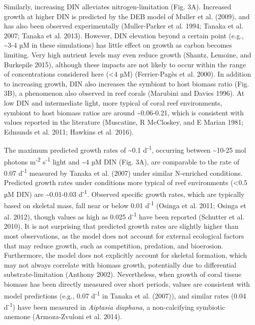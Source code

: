 \documentclass[]{elsarticle} %
\begin{document}
Similarly, increasing DIN alleviates nitrogen-limitation (Fig. 3A).
Increased growth at higher DIN is predicted by the DEB model of Muller
et al. (2009), and has also been observed experimentally (Muller-Parker
et al. 1994; Tanaka et al. 2007; Tanaka et al. 2013). However, DIN
elevation beyond a certain point (e.g., \textasciitilde{}3-4 µM in these
simulations) has little effect on growth as carbon becomes limiting.
Very high nutrient levels may even reduce growth (Shantz, Lemoine, and
Burkepile 2015), although these impacts are not likely to occur within
the range of concentrations considered here (\textless{}4 µM)
(Ferrier-Pagès et al. 2000). In addition to increasing growth, DIN also
increases the symbiont to host biomass ratio (Fig. 3B), a phenomenon
also observed in reef corals (Marubini and Davies 1996). At low DIN and
intermediate light, more typical of coral reef environments, symbiont to
host biomass ratios are around \textasciitilde{}0.06-0.21, which is
consistent with values reported in the literature (Muscatine, R
McCloskey, and E Marian 1981; Edmunds et al. 2011; Hawkins et al. 2016).

The maximum predicted growth rates of \textasciitilde{}0.1
d\textsuperscript{-1}, occurring between \textasciitilde{}10-25 mol
photons m\textsuperscript{-2} s\textsuperscript{-1} light and
\textasciitilde{}4 µM DIN (Fig. 3A), are comparable to the rate of 0.07
d\textsuperscript{-1} measured by Tanaka et al. (2007) under similar
N-enriched conditions. Predicted growth rates under conditions more
typical of reef environments (\textless{}0.5 µM DIN) are
\textasciitilde{}0.01-0.03 d\textsuperscript{-1}. Observed specific
growth rates, which are typically based on skeletal mass, fall near or
below 0.01 d\textsuperscript{-1} (Osinga et al. 2011; Osinga et al.
2012), though values as high as 0.025 d\textsuperscript{-1} have been
reported (Schutter et al. 2010). It is not surprising that predicted
growth rates are slightly higher than most observations, as the model
does not account for external ecological factors that may reduce growth,
such as competition, predation, and bioerosion. Furthermore, the model
does not explicitly account for skeletal formation, which may not always
correlate with biomass growth, potentially due to differential
substrate-limitation (Anthony 2002). Nevertheless, when growth of coral
tissue biomass has been directly measured over short periods, values are
consistent with model predictions (e.g., 0.07 d\textsuperscript{-1} in
Tanaka et al. (2007)), and similar rates (0.04 d\textsuperscript{-1})
have been measured in \emph{Aiptasia diaphana}, a non-calcifying
symbiotic anemone (Armoza-Zvuloni et al. 2014).
\end{document}
